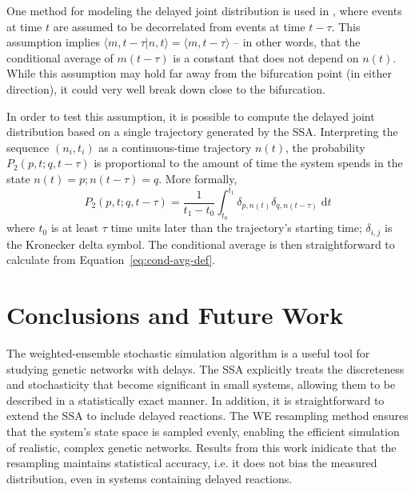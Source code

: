 \documentclass[english,letterpaper,12pt]{report}
\newcommand{\dee}{\;\mathrm{d}}
\begin{document}
\begin{doublespacing}
One method for modeling the delayed joint distribution is used in \cite{delay-oscillations}, where events at time $t$ are assumed to be decorrelated from events at time $t - \tau$. This assumption implies $\langle m, t - \tau | n, t \rangle = \langle m, t - \tau \rangle$ -- in other words, that the conditional average of $m(t - \tau)$ is a constant that does not depend on $n(t)$. While this assumption may hold far away from the bifurcation point (in either direction), it could very well break down close to the bifurcation.

In order to test this assumption, it is possible to compute the delayed joint distribution based on a single trajectory generated by the SSA. Interpreting the sequence $(n_i, t_i)$ as a continuous-time trajectory $n(t)$, the probability $P_2(p, t; q, t - \tau)$ is proportional to the amount of time the system spends in the state $n(t) = p; n(t - \tau) = q$. More formally,
\begin{equation}
    P_2(p, t; q, t - \tau) = \frac{1}{t_1 - t_0} \int_{t_0}^{t_1} \delta_{p, n(t)} \delta_{q, n(t - \tau)} \dee t
    \label{eq:joint-pdist-calc}
\end{equation}
where $t_0$ is at least $\tau$ time units later than the trajectory's starting time; $\delta_{i,j}$ is the Kronecker delta symbol. The conditional average is then straightforward to calculate from Equation~\eqref{eq:cond-avg-def}.







\chapter{Conclusions and Future Work} %
\label{sec:conclusions}

The weighted-ensemble stochastic simulation algorithm is a useful tool for studying genetic networks with delays. The SSA explicitly treats the discreteness and stochasticity that become significant in small systems, allowing them to be described in a statistically exact manner. In addition, it is straightforward to extend the SSA to include delayed reactions. The WE resampling method ensures that the system's state space is sampled evenly, enabling the efficient simulation of realistic, complex genetic networks. Results from this work inidicate that the resampling maintains statistical accuracy, i.e. it does not bias the measured distribution, even in systems containing delayed reactions.


\end{doublespacing}
\end{document}
